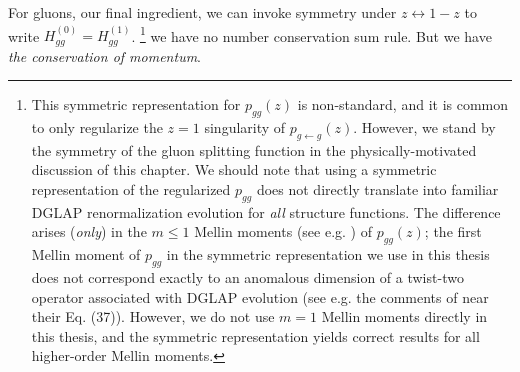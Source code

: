 For gluons, our final ingredient, we can invoke symmetry under \(z \leftrightarrow 1-z\) to write \(H^{(0)}_{gg} = H^{(1)}_{gg}\).%
\footnote{
    This symmetric representation for \(p_{gg}(z)\) is non-standard, and it is common to only regularize the \(z=1\) singularity of \(p_{g\leftarrow g}(z)\).
    However, we stand by the symmetry of the gluon splitting function in the physically-motivated discussion of this chapter.
    We should note that using a symmetric representation of the regularized \(p_{gg}\) does not directly translate into familiar DGLAP renormalization evolution for \emph{all} structure functions.
    The difference arises (\emph{only}) in the \(m\leq1\) Mellin moments (see e.g. ) of \(p_{gg}(z)\);
    the first Mellin moment of \(p_{gg}\) in the symmetric representation we use in this thesis does not correspond exactly to an anomalous dimension of a twist-two operator associated with DGLAP evolution (see e.g. the comments of  near their Eq. (37)).
    However, we do not use \(m=1\) Mellin moments directly in this thesis, and the symmetric representation yields correct results for all higher-order Mellin moments.
}
%
we have no number conservation sum rule.
%
But we have \emph{the conservation of momentum}.


